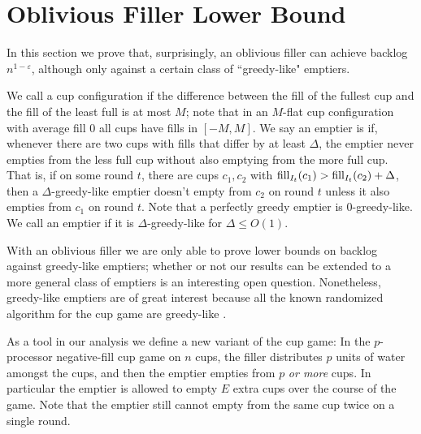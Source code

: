 
\section{Oblivious Filler Lower Bound}\label{sec:oblivious}
In this section we prove that, surprisingly, an oblivious filler
can achieve backlog $n^{1-\varepsilon}$, although only against a
certain class of ``greedy-like" emptiers.

We call a cup configuration  if the difference
between the fill of the fullest cup and the fill of the least
full is at most $M$; note that in an $M$-flat cup configuration
with average fill $0$ all cups have fills in $[-M, M]$. We say an
emptier is  if, whenever there are two
cups with fills that differ by at least $\Delta$, the emptier
never empties from the less full cup without also emptying from
the more full cup. That is, if on some round $t$, there are cups
$c_1, c_2$ with $\operatorname{\textnormal{fill}}_{I_t}(c_1) > \operatorname{\textnormal{fill}}_{I_t}(c_2) + \Delta$,
then a $\Delta$-greedy-like emptier doesn't empty from $c_2$ on
round $t$ unless it also empties from $c_1$ on round $t$. Note
that a perfectly greedy emptier is $0$-greedy-like. We call an
emptier  if it is $\Delta$-greedy-like for
$\Delta \le O(1)$. 

With an oblivious filler we are only able to prove lower bounds
on backlog against greedy-like emptiers; whether or not our
results can be extended to a more general class of emptiers is an
interesting open question. Nonetheless, greedy-like emptiers are
of great interest because all the known randomized algorithm for
the cup game are greedy-like \cite{mbe19, wku20}.

As a tool in our analysis we define a new variant of the cup
game: In the $p$-processor  negative-fill cup
game on $n$ cups, the filler distributes $p$ units of water
amongst the cups, and then the emptier empties from $p$
\textit{or more} cups. In particular the emptier is
allowed to empty $E$ extra cups over the course of the game. Note
that the emptier still cannot empty from the same cup twice on a
single round.

